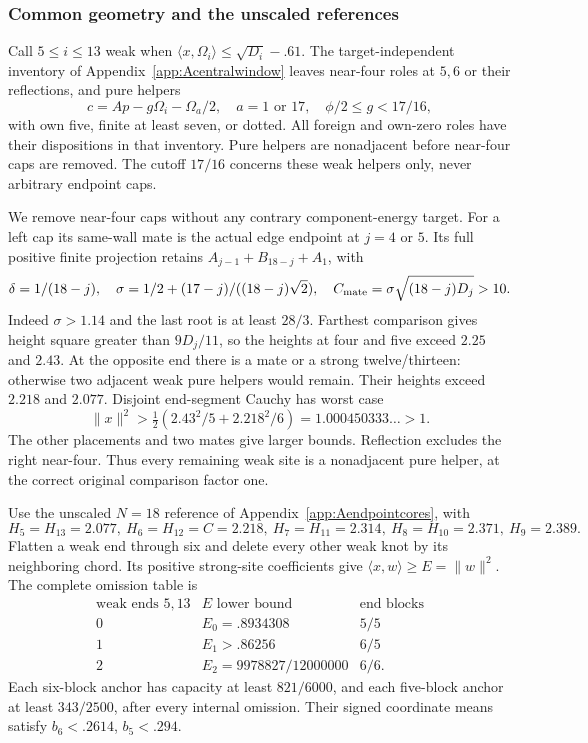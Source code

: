 \documentclass[11pt]{article}
\theoremstyle{definition}
\theoremstyle{remark}
\newcommand{\ip}[2]{\langle #1,#2\rangle}
\newcommand{\norm}[1]{\lVert #1\rVert}
\begin{document}
\subsubsection{Common geometry and the unscaled references}
Call \(5\le i\le13\) weak when
\(\ip x{\Omega_i}\le\sqrt{D_i}-.61\).
The target-independent inventory of Appendix~\ref{app:Acentralwindow}
leaves near-four roles at \(5,6\) or their reflections, and pure helpers
\[
 c=Ap-g\Omega_i-\Omega_a/2,\quad a=1\text{ or }17,
 \quad\phi/2\le g<17/16,
\]
with own five, finite at least seven, or dotted. All foreign and own-zero
roles have their dispositions in that inventory. Pure helpers are
nonadjacent before near-four caps are removed. The cutoff \(17/16\)
concerns these weak helpers only, never arbitrary endpoint caps.

We remove near-four caps without any contrary component-energy target.
For a left cap its same-wall mate is the actual edge endpoint at
\(j=4\) or \(5\). Its full positive finite projection retains
\(A_{j-1}+B_{18-j}+A_1\), with
\[
 \delta=1/(18-j),\quad
 \sigma=1/2+(17-j)/((18-j)\sqrt2),\quad
 C_{\rm mate}=\sigma\sqrt{(18-j)D_j}>10.
\]
Indeed \(\sigma>1.14\) and the last root is at least \(28/3\).
Farthest comparison gives height square greater than \(9D_j/11\),
so the heights at four and five exceed \(2.25\) and \(2.43\).
At the opposite end there is a mate or a strong twelve/thirteen:
otherwise two adjacent weak pure helpers would remain. Their heights
exceed \(2.218\) and \(2.077\). Disjoint end-segment Cauchy has
worst case
\[
 \norm x^2>\tfrac12(2.43^2/5+2.218^2/6)
                  =1.000450333\ldots>1.
\]
The other placements and two mates give larger bounds. Reflection
excludes the right near-four. Thus every remaining weak site is a
nonadjacent pure helper, at the correct original comparison factor one.

Use the unscaled \(N=18\) reference of
Appendix~\ref{app:Aendpointcores}, with
\[
 H_5=H_{13}=2.077,\ H_6=H_{12}=C=2.218,
 \ H_7=H_{11}=2.314,\ H_8=H_{10}=2.371,\ H_9=2.389.
\]
Flatten a weak end through six and delete every other weak knot by
its neighboring chord. Its positive strong-site coefficients give
\(\ip xw\ge E=\norm w^2\). The complete omission table is
\[
\begin{array}{c|c|c}
\text{weak ends }5,13&E\text{ lower bound}&\text{end blocks}\\\hline
0&E_0=.8934308&5/5\\
1&E_1>.86256&6/5\\
2&E_2=9978827/12000000&6/6.
\end{array}
\]
Each six-block anchor has capacity at least \(821/6000\), and each
five-block anchor at least \(343/2500\), after every internal omission.
Their signed coordinate means satisfy \(b_6<.2614\), \(b_5<.294\).
\end{document}
